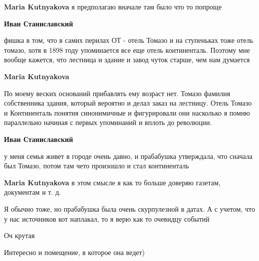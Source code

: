 \begin{itemize} %
\textbf{Maria Kutnyakova} я предполагаю вначале там было что то попроще

\begin{itemize} %
\textbf{Иван Станиславский} 

фишка в том, что в самих перилах ОТ - отель Томазо и на ступеньках тоже отель
томазо, хотя в 1898 году упоминается все еще отель континенталь. Поэтому мне
вообще кажется, что лестница и здание и завод чуток старше, чем нам думается

\textbf{Maria Kutnyakova} 

По моему веских оснований прибавлять ему возраст нет. Томазо фамилия
собственника здания, который вероятно и делал заказ на лестницу. Отель Томазо и
Континенталь понятия синонимичные и фигурировали они насколько я помню
параллельно начиная с первых упоминаний и вплоть до революции.

\textbf{Иван Станиславский} 

у меня семья живет в городе очень давно, и прабабушка утверждала, что сначала
был Томазо, потом там чето произошло и стал континенталь

\textbf{Maria Kutnyakova} в этом смысле я как то больше доверяю газетам, документам и т. д. 🙂


Я обычно тоже, но прабабушка была очень скурпулезной в датах. А с учетом, что у
нас источников кот наплакал, то я верю как то очевидцу событий

\end{itemize} %

\end{itemize} %


Оч крутая


Интересно и помещение, в которое она ведет)
